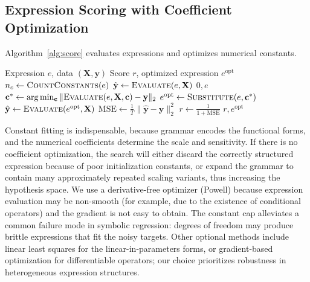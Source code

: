 \subsection{Expression Scoring with Coefficient Optimization}
\label{subsec:scoring}

Algorithm~\ref{alg:score} evaluates expressions and optimizes numerical constants.

\begin{algorithm}[htbp]
\caption{Expression Scoring with Coefficient Estimation}
\label{alg:score}
\begin{algorithmic}[1]
\Require Expression $e$, data $(\mathbf{X}, \mathbf{y})$
\Ensure Score $r$, optimized expression $e^{\text{opt}}$
\State $n_c \leftarrow \textsc{CountConstants}(e)$
    \State $\hat{\mathbf{y}} \leftarrow \textsc{Evaluate}(e, \mathbf{X})$
    \State \Return $0, e$ 
\Else
    \State $\mathbf{c}^{*} \leftarrow \arg\min_{\mathbf{c}} \| \textsc{Evaluate}(e, \mathbf{X}, \mathbf{c}) - \mathbf{y} \|_{2}$ 
    \State $e^{\text{opt}} \leftarrow \textsc{Substitute}(e, \mathbf{c}^{*})$
    \State $\hat{\mathbf{y}} \leftarrow \textsc{Evaluate}(e^{\text{opt}}, \mathbf{X})$
\EndIf
\State $\text{MSE} \leftarrow \frac{1}{T}\|\hat{\mathbf{y}} - \mathbf{y}\|_{2}^{2}$
\State $r \leftarrow \frac{1}{1 + \text{MSE}}$ 
\State \Return $r, e^{\text{opt}}$
\end{algorithmic}
\end{algorithm}

Constant fitting is indispensable, because grammar encodes the functional forms, and the numerical coefficients determine the scale and sensitivity. If there is no coefficient optimization, the search will either discard the correctly structured expression because of poor initialization constants, or expand the grammar to contain many approximately repeated scaling variants, thus increasing the hypothesis space. We use a derivative-free optimizer (Powell) because expression evaluation may be non-smooth (for example, due to the existence of conditional operators) and the gradient is not easy to obtain. The constant cap alleviates a common failure mode in symbolic regression: degrees of freedom may produce brittle expressions that fit the noisy targets. Other optional methods include linear least squares for the linear-in-parameters forms, or gradient-based optimization for differentiable operators; our choice prioritizes robustness in heterogeneous expression structures.
